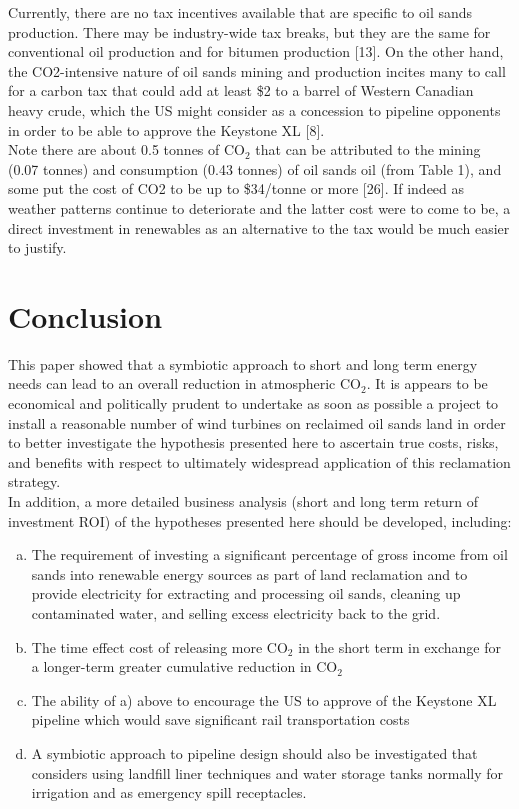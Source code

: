 \documentclass[12pt]{article}
\begin{document}
Currently, there are no tax incentives available that are specific to oil sands production. There may be industry-wide tax breaks, but they are the same for conventional oil production and for bitumen production [13]. On the other hand, the CO2-intensive nature of oil sands mining and production incites many to call for a carbon tax that could add at least \$2 to a barrel of Western Canadian heavy crude, which the US might consider as a concession to pipeline opponents in order to be able to approve the Keystone XL [8].   \\

Note there are about 0.5 tonnes of CO$_2$ that can be attributed to the mining (0.07 tonnes) and consumption (0.43 tonnes) of oil sands oil (from Table 1), and some put the cost of CO2 to be up to \$34/tonne or more [26]. If indeed as weather patterns continue to deteriorate and the latter cost were to come to be, a direct investment in renewables as an alternative to the tax would be much easier to justify. 

\section{Conclusion}
This paper showed that a symbiotic approach to short and long term energy needs can lead to an overall reduction in atmospheric CO$_2$. It is appears to be economical and politically prudent to undertake as soon as possible a project to install a reasonable number of wind turbines on reclaimed oil sands land in order to better investigate the hypothesis presented here to ascertain true costs, risks, and benefits with respect to ultimately widespread application of this reclamation strategy.\\

In addition, a more detailed business analysis (short and long term return of investment ROI) of the hypotheses presented here should be developed, including:

\begin{enumerate}[a)]
\item The requirement of investing a significant percentage of gross income from oil sands into renewable energy sources as part of land reclamation and to provide electricity for extracting and processing oil sands, cleaning up contaminated water, and selling excess electricity back to the grid. 
\item The time effect cost of releasing more CO$_2$ in the short term in exchange for a longer-term greater cumulative reduction in CO$_2$
\item The ability of a) above to encourage the US to approve of the Keystone XL pipeline which would save significant rail transportation costs
\item A symbiotic approach to pipeline design should also be investigated that considers using landfill liner techniques and water storage tanks normally for irrigation and as emergency spill receptacles.
\end{enumerate}
\end{document}
